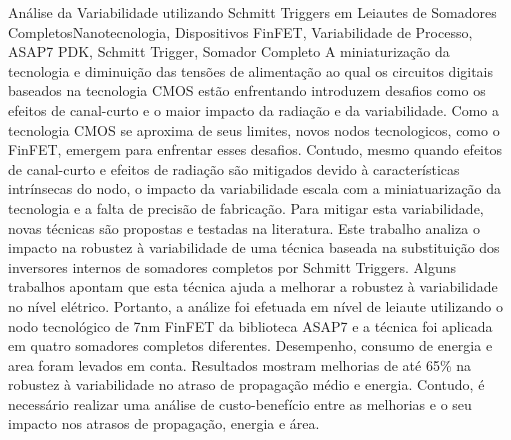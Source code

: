 \documentclass[ecp,tc, english]{iiufrgs}
\begin{document}
\begin{englishabstract}{Análise da Variabilidade utilizando Schmitt Triggers em Leiautes de Somadores Completos}{Nanotecnologia, Dispositivos FinFET, Variabilidade de Processo, ASAP7 PDK, Schmitt Trigger, Somador Completo}
A miniaturização da tecnologia e diminuição das tensões de alimentação ao qual os circuitos digitais baseados na tecnologia CMOS estão enfrentando introduzem desafios como os efeitos de canal-curto e o maior impacto da radiação e da variabilidade. Como a tecnologia CMOS se aproxima de seus limites, novos nodos tecnologicos, como o FinFET, emergem para enfrentar esses desafios. Contudo, mesmo quando efeitos de canal-curto e efeitos de radiação são mitigados devido à características intrínsecas do nodo, o impacto da variabilidade escala com a miniatuarização da tecnologia e a falta de precisão de fabricação. Para mitigar esta variabilidade, novas técnicas são propostas e testadas na literatura. Este trabalho analiza o impacto na robustez à variabilidade de uma técnica baseada na substituição dos inversores internos de somadores completos por Schmitt Triggers. Alguns trabalhos apontam que esta técnica ajuda a melhorar a robustez à variabilidade no nível elétrico. Portanto, a análize foi efetuada em nível de leiaute utilizando o nodo tecnológico de 7nm FinFET da biblioteca ASAP7 e a técnica foi aplicada em quatro somadores completos diferentes. Desempenho, consumo de energia e area foram levados em conta. Resultados mostram melhorias de até 65\% na robustez à variabilidade no atraso de propagação médio e energia. Contudo, é necessário realizar uma análise de custo-benefício entre as melhorias e o seu impacto nos atrasos de propagação, energia e área.
\end{englishabstract}
\end{document}
